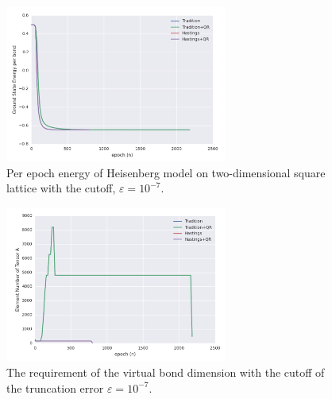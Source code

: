 \begin{figure}[ht]
	\centering
	\includegraphics[width=0.65\textwidth]{figures/fig326.png}
	\caption[Energy per epoch of Heisenberg model on two-dimensional square lattice with the cutoff, $\varepsilon = 10^{-7}$]{Per epoch energy of Heisenberg model on two-dimensional square lattice with the cutoff, $\varepsilon = 10^{-7}$.}
	\label{fig326}
\end{figure}

\begin{figure}[ht]
	\centering
	\includegraphics[width=0.65\textwidth]{figures/fig327.png}
	\caption[The requirement of the virtaul bond dimension with the cutoff of the truncation error $\varepsilon = 10^{-7}$]{The requirement of the virtual bond dimension with the cutoff of the truncation error $\varepsilon = 10^{-7}$.}
	\label{fig327}
\end{figure}
